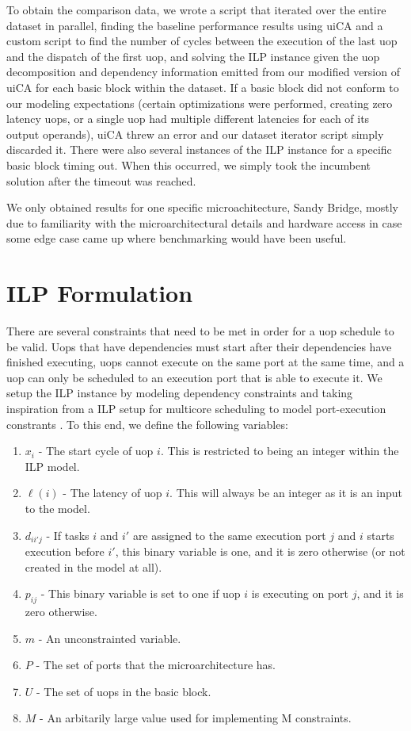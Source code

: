\documentclass[sigconf]{acmart}
\begin{document}
To obtain the comparison data, we wrote a script that iterated over the entire dataset in parallel, finding the baseline
performance results using uiCA and a custom script to find the number of cycles between the execution of the last uop
and the dispatch of the first uop, and solving the ILP instance given the uop decomposition and dependency information
emitted from our modified version of uiCA for each basic block within the dataset. If a basic block did not conform to
our modeling expectations (certain optimizations were performed, creating zero latency uops, or a single uop had multiple
different latencies for each of its output operands), uiCA threw an error and our dataset iterator script simply
discarded it. There were also several instances of the ILP instance for a specific basic block timing out. When this
occurred, we simply took the incumbent solution after the timeout was reached.

We only obtained results for one specific microachitecture, Sandy Bridge, mostly due to familiarity with the
microarchitectural details and hardware access in case some edge case came up where benchmarking would have been
useful.

\section{ILP Formulation}
\label{sec:ilp-formulation}

There are several constraints that need to be met in order for a uop schedule to be valid. Uops that have dependencies
must start after their dependencies have finished executing, uops cannot execute on the same port at the same time,
and a uop can only be scheduled to an execution port that is able to execute it. We setup the ILP instance by modeling
dependency constraints and taking inspiration from a ILP setup for multicore scheduling to model port-execution
constrants \cite{ying2009multicoreilp}. To this end, we define the following variables:

\begin{enumerate}
    \item $x_i$ - The start cycle of uop $i$. This is restricted to being an integer within the ILP model.
    \item $\ell(i)$ - The latency of uop $i$. This will always be an integer as it is an input to the model.
    \item $d_{ii'j}$ - If tasks $i$ and $i'$ are assigned to the same execution port $j$ and $i$ starts execution before $i'$, this binary variable is one, and it is zero otherwise (or not created in the model at all).
    \item $p_{ij}$ - This binary variable is set to one if uop $i$ is executing on port $j$, and it is zero otherwise.
    \item $m$ - An unconstrainted variable.
    \item $P$ - The set of ports that the microarchitecture has.
    \item $U$ - The set of uops in the basic block.
    \item $M$ - An arbitarily large value used for implementing M constraints.
\end{enumerate}
\end{document}
